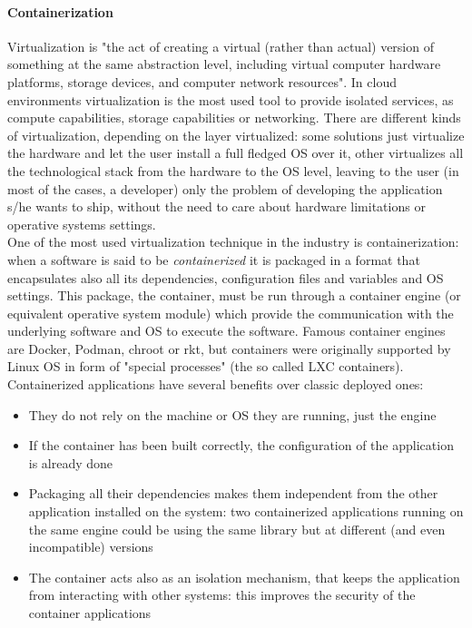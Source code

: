 \paragraph{Containerization}
  Virtualization is "the act of creating a virtual (rather than actual) version of something at the same abstraction level, including virtual computer hardware platforms, storage devices, and computer network resources"\cite{wiki:virtualization}. In cloud environments virtualization is the most used tool to provide isolated services, as compute capabilities, storage capabilities or networking. There are different kinds of virtualization, depending on the layer virtualized: some solutions just virtualize the hardware and let the user install a full fledged OS over it, other virtualizes all the technological stack from the hardware to the OS level, leaving to the user (in most of the cases, a developer) only the problem of developing the application s/he wants to ship, without the need to care about hardware limitations or operative systems settings.\\
  
  One of the most used virtualization technique in the industry is containerization: when a software is said to be \textit{containerized} it is packaged in a format that encapsulates also all its dependencies, configuration files and variables and OS settings. This package, the container, must be run through a container engine (or equivalent operative system module) which provide the communication with the underlying software and OS to execute the software. Famous container engines are Docker, Podman, chroot or rkt, but containers were originally supported by Linux OS in form of "special processes" (the so called LXC containers). Containerized applications have several benefits over classic deployed ones:
  \begin{itemize}
    \item They do not rely on the machine or OS they are running, just the engine
    \item If the container has been built correctly, the configuration of the application is already done
    \item Packaging all their dependencies makes them independent from the other application installed on the system: two containerized applications running on the same engine could be using the same library but at different (and even incompatible) versions
    \item The container acts also as an isolation mechanism, that keeps the application from interacting with other systems: this improves the security of the container applications
  \end{itemize}
  
